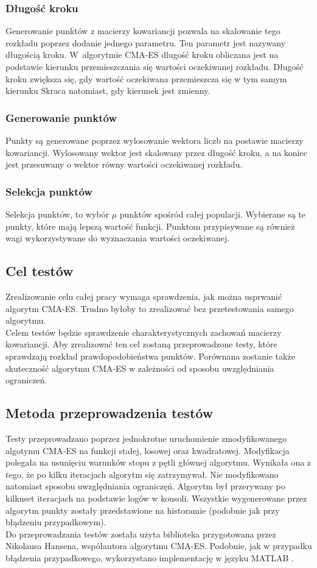 \documentclass{mini}
\newcommand{\CMAES}{\mbox{CMA-ES}}
\begin{document}
\subsubsection*{Długość kroku}
Generowanie punktów z macierzy kowariancji pozwala na skalowanie tego rozkładu poprzez dodanie jednego parametru. Ten parametr jest nazywany długością kroku. W~algorytmie CMA-ES dlugość kroku obliczana jest na podstawie kierunku przemieszczania się wartości oczekiwanej rozkładu. Długość kroku zwiększa się, gdy wartość oczekiwana przemieszcza się w tym samym kierunku Skraca natomiast, gdy kierunek jest zmienny.

\subsubsection*{Generowanie punktów}
Punkty są generowane poprzez wylosowanie wektora liczb na postawie macierzy kowariancji. Wylosowany wektor jest skalowany przez długość kroku, a na koniec jest przesuwany o wektor równy wartości oczekiwanej rozkładu.

\subsubsection*{Selekcja punktów}
Selekcja punktów, to wybór $\mu$ punktów spośród całej populacji. Wybierane są te punkty, które mają lepszą wartość funkcji. Punktom przypisywane są również wagi wykorzystywane do wyznaczania wartości oczekiwanej.

\subsection{Cel testów}
Zrealizowanie celu całej pracy wymaga sprawdzenia, jak można usprwanić algorytm \CMAES. Trudno byłoby to zrealizować bez przetestowania samego algorytmu.\\
Celem testów będzie sprawdzenie charakterystycznych zachowań macierzy kowariancji. Aby zrealizować ten cel zostaną przeprowadzone testy, które sprawdzają rozkład prawdopodobieństwa punktów. Porównana zostanie także skuteczność algorytmu CMA-ES w zależności od sposobu uwzględniania ograniczeń.

\subsection{Metoda przeprowadzenia testów}
Testy przeprowadzano poprzez jednokrotne uruchomienie zmodyfikowanego algotymu CMA-ES na funkcji stałej, losowej oraz kwadratowej. Modyfikacja polegała na usunięciu warunków stopu z pętli głównej algorytmu. Wynikała ona z tego, że po kilku iteracjach algorytm się zatrzymywał. Nie modyfikowano natomiast sposobu uwzględniania ograniczęń. Algorytm był przerywany po kilkuset iteracjach na podstawie logów w konsoli. Wszystkie wygenerowane przez algorytm punkty zostały przedstawione na historamie (podobnie jak przy błądzeniu przypadkowym).\\
Do przeprowadzania testów została użyta biblioteka przygotowana przez Nikolausa Hansena, współautora algorytmu CMA-ES. Podobnie, jak w przypadku błądzenia przypadkowego, wykorzystano implementację w języku MATLAB \cite{cmaes_code}.
\end{document}

